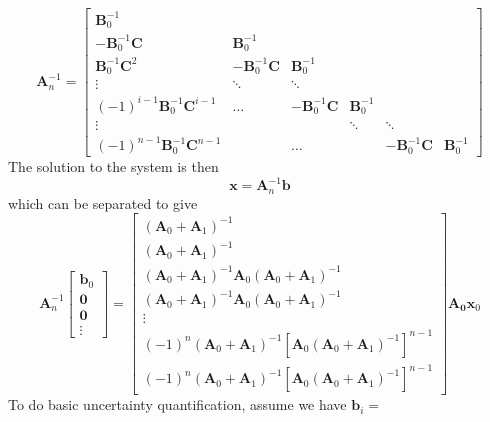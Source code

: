 \documentclass[11pt]{article}
\begin{document}
\begin{equation}
\mathbf{A}_{n}^{-1} = \left[ \begin{array}{cccccc}\mathbf{B}_{0}^{-1} & & & & &  \\ -\mathbf{B}_{0}^{-1}\mathbf{C}  & \mathbf{B}_{0}^{-1} & & & & \\  \mathbf{B}_{0}^{-1}\mathbf{C}^2 & -\mathbf{B}_{0}^{-1}\mathbf{C}  &  \mathbf{B}_{0}^{-1} & & & \\ \vdots &  \ddots & \ddots & & & \\  (-1)^{i-1}\mathbf{B}_{0}^{-1}\mathbf{C}^{i-1} & \ldots&   -\mathbf{B}_{0}^{-1}\mathbf{C}& \mathbf{B}_0^{-1}&  & \\ \vdots &  &   & \ddots& \ddots& \\ (-1)^{n-1}\mathbf{B}_{0}^{-1}\mathbf{C}^{n-1} & & \ldots & & -\mathbf{B}_{0}^{-1}\mathbf{C}&\mathbf{B}_0^{-1} \end{array} \right] 
\end{equation} 
The solution to the system is then
\begin{equation}
\mathbf{x} = \mathbf{A}_n^{-1}\mathbf{b}
\end{equation}
which can be separated to give 
\begin{equation}
\mathbf{A}_n^{-1}\left[ \begin{array}{c} \mathbf{b}_0 \\ \mathbf{0} \\ \mathbf{0} \\ \vdots \end{array}\right] = \left[ \begin{array}{c} (\mathbf{A}_0+\mathbf{A}_1)^{-1} \\ (\mathbf{A}_0+\mathbf{A}_1)^{-1}  \\  (\mathbf{A}_0+\mathbf{A}_1)^{-1}\mathbf{A}_0(\mathbf{A}_0+\mathbf{A}_1)^{-1} \\   (\mathbf{A}_0+\mathbf{A}_1)^{-1}\mathbf{A}_0(\mathbf{A}_0+\mathbf{A}_1)^{-1} \\ \vdots  \\  (-1)^n(\mathbf{A}_0+\mathbf{A}_1)^{-1}[\mathbf{A}_0(\mathbf{A}_0+\mathbf{A}_1)^{-1}]^{n-1} \\  (-1)^n(\mathbf{A}_0+\mathbf{A}_1)^{-1}[\mathbf{A}_0(\mathbf{A}_0+\mathbf{A}_1)^{-1}]^{n-1} \end{array}\right]\mathbf{A_0}\mathbf{x}_0
\end{equation}
To do basic uncertainty quantification, assume we have $\mathbf{b}_i =$ 
\end{document}
